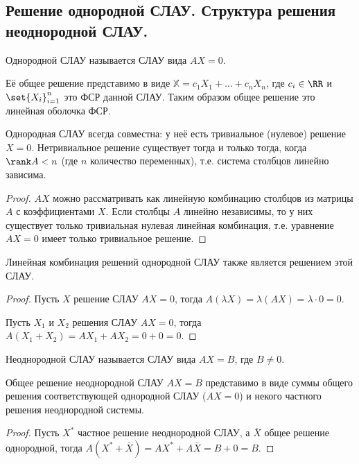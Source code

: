 \subsection{%
  Решение однородной СЛАУ. Структура решения неоднородной СЛАУ.%
}

\begin{definition}
  Однородной СЛАУ называется СЛАУ вида \(AX = 0\).
\end{definition}

Её общее решение представимо в виде \(\mathbb{X} = c_1 X_1 + \dotsc + c_n X_n\),
где \(c_i \in \RR\) и \(\set{X_i}_{i = 1}^n\) это ФСР  данной СЛАУ. Таким
образом общее решение это линейная оболочка ФСР.

\begin{theorem}
  Однородная СЛАУ всегда совместна: у неё есть тривиальное (нулевое) решение \(X
  = 0\). Нетривиальное решение существует тогда и только тогда, когда \(\rank A
  < n\) (где \(n\) количество переменных), т.е. система столбцов линейно
  зависима.
\end{theorem}

\begin{proof}
  \(AX\) можно рассматривать как линейную комбинацию столбцов из матрицы \(A\) с
  коэффициентами \(X\). Если столбцы \(A\) линейно независимы, то у них
  существует только тривиальная нулевая линейная комбинация, т.е. уравнение \(AX
  = 0\) имеет только тривиальное решение.
\end{proof}

\begin{theorem}
  Линейная комбинация решений однородной СЛАУ также является решением этой СЛАУ.
\end{theorem}

\begin{proof}
  Пусть \(X\) решение СЛАУ \(AX = 0\), тогда \(A (\lambda X) = \lambda (AX) =
  \lambda \cdot 0 = 0\).
  
  Пусть \(X_1\) и \(X_2\) решения СЛАУ \(AX = 0\), тогда \(A (X_1 + X_2) = A X_1
  + A X_2 = 0 + 0 = 0\).
\end{proof}

\begin{definition}
  Неоднородной СЛАУ называется СЛАУ вида \(AX = B\), где \(B \ne 0\).
\end{definition}

\begin{theorem}
  Общее решение неоднородной СЛАУ \(AX = B\) представимо в виде суммы общего
  решения соответствующей однородной СЛАУ (\(AX = 0\)) и некого частного решения
  неоднородной системы.
\end{theorem}

\begin{proof}
  Пусть \(X^*\) частное решение неоднородной СЛАУ, а \(\bar{X}\) общее решение
  однородной, тогда \(A (X^* + \bar{X}) = A X^* + A \bar{X} = B + 0 = B\).
\end{proof}
